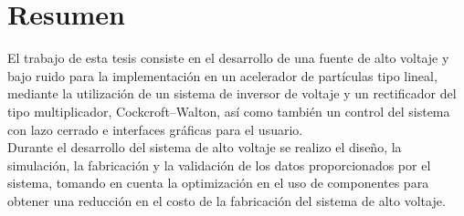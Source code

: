 



\chapter{Resumen} %

El trabajo de esta tesis consiste en el desarrollo de una fuente de alto voltaje y bajo ruido para la implementación en un acelerador de partículas tipo lineal, mediante la utilización  de un sistema de inversor de voltaje y un rectificador del tipo multiplicador, Cockcroft–Walton, así como también un control del sistema con lazo cerrado e interfaces gráficas para el usuario.\\

Durante el desarrollo del sistema de alto voltaje se realizo el diseño, la simulación, la fabricación y la validación de los datos proporcionados por el sistema, tomando en cuenta la optimización en el uso de componentes para obtener una reducción en el costo de la fabricación del sistema de alto voltaje.\\

